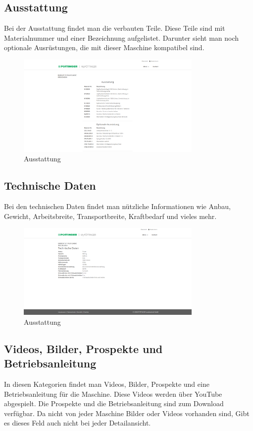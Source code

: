 \subsection{Ausstattung}
Bei der Ausstattung findet man die verbauten Teile. Diese Teile sind mit Materialnummer und einer Bezeichnung aufgelistet. Darunter sieht man noch optionale Ausrüstungen, die mit dieser Maschine kompatibel sind.
\begin{figure}[H]
	\centerline{
		\includegraphics[width=0.8\textwidth]{./grafiken/erm_detailansicht_ausstattung.PNG}
	}
	\vskip0pt
	\caption{Ausstattung} \label{fig:ausstattung}
\end{figure}
\subsection{Technische Daten}
Bei den technischen Daten findet man nützliche Informationen wie Anbau, Gewicht, Arbeitsbreite, Transportbreite, Kraftbedarf und vieles mehr.
\begin{figure}[H]
	\centerline{
		\includegraphics[width=0.8\textwidth]{./grafiken/erm_detailansicht_technisch.PNG}
	}
	\vskip0pt
	\caption{Ausstattung} \label{fig:ausstattung}
\end{figure}
\subsection{Videos, Bilder, Prospekte und Betriebsanleitung}
In diesen Kategorien findet man Videos, Bilder, Prospekte und eine Betriebsanleitung für die Maschine. Diese Videos werden über YouTube abgespielt. Die Prospekte und die Betriebsanleitung sind zum Download verfügbar. Da nicht von jeder Maschine Bilder oder Videos vorhanden sind, Gibt es dieses Feld auch nicht bei jeder Detailansicht.
